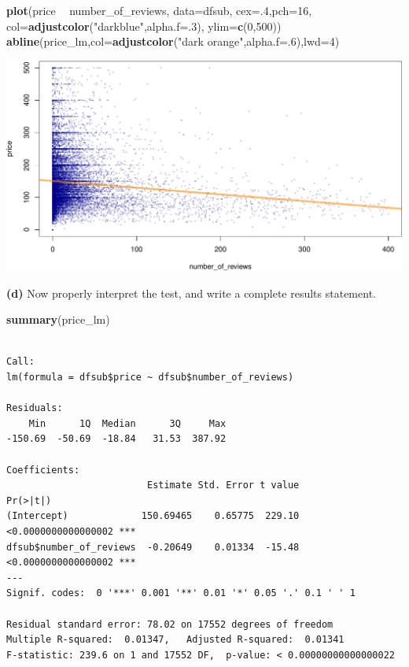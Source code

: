 \documentclass[]{book}
\newenvironment{Shaded}{\begin{snugshade}}{\end{snugshade}}
\newcommand{\DataTypeTok}[1]{\textcolor[rgb]{0.13,0.29,0.53}{#1}}
\newcommand{\DecValTok}[1]{\textcolor[rgb]{0.00,0.00,0.81}{#1}}
\newcommand{\KeywordTok}[1]{\textcolor[rgb]{0.13,0.29,0.53}{\textbf{#1}}}
\newcommand{\NormalTok}[1]{#1}
\newcommand{\OperatorTok}[1]{\textcolor[rgb]{0.81,0.36,0.00}{\textbf{#1}}}
\newcommand{\StringTok}[1]{\textcolor[rgb]{0.31,0.60,0.02}{#1}}
\begin{document}
\begin{Shaded}
\begin{Highlighting}[]
\KeywordTok{plot}\NormalTok{(price }\OperatorTok{~}\StringTok{ }\NormalTok{number_of_reviews,}
     \DataTypeTok{data=}\NormalTok{dfsub,}
     \DataTypeTok{cex=}\NormalTok{.}\DecValTok{4}\NormalTok{,}\DataTypeTok{pch=}\DecValTok{16}\NormalTok{,}
     \DataTypeTok{col=}\KeywordTok{adjustcolor}\NormalTok{(}\StringTok{"darkblue"}\NormalTok{,}\DataTypeTok{alpha.f=}\NormalTok{.}\DecValTok{3}\NormalTok{),}
     \DataTypeTok{ylim=}\KeywordTok{c}\NormalTok{(}\DecValTok{0}\NormalTok{,}\DecValTok{500}\NormalTok{))}
\KeywordTok{abline}\NormalTok{(price_lm,}\DataTypeTok{col=}\KeywordTok{adjustcolor}\NormalTok{(}\StringTok{"dark orange"}\NormalTok{,}\DataTypeTok{alpha.f=}\NormalTok{.}\DecValTok{6}\NormalTok{),}\DataTypeTok{lwd=}\DecValTok{4}\NormalTok{)}
\end{Highlighting}
\end{Shaded}

\includegraphics{figures/unnamed-chunk-344-1.pdf}

\textbf{(d)} Now properly interpret the test, and write a complete results statement.

\begin{Shaded}
\begin{Highlighting}[]
\KeywordTok{summary}\NormalTok{(price_lm)}
\end{Highlighting}
\end{Shaded}

\begin{verbatim}

Call:
lm(formula = dfsub$price ~ dfsub$number_of_reviews)

Residuals:
    Min      1Q  Median      3Q     Max 
-150.69  -50.69  -18.84   31.53  387.92 

Coefficients:
                         Estimate Std. Error t value            Pr(>|t|)    
(Intercept)             150.69465    0.65775  229.10 <0.0000000000000002 ***
dfsub$number_of_reviews  -0.20649    0.01334  -15.48 <0.0000000000000002 ***
---
Signif. codes:  0 '***' 0.001 '**' 0.01 '*' 0.05 '.' 0.1 ' ' 1

Residual standard error: 78.02 on 17552 degrees of freedom
Multiple R-squared:  0.01347,   Adjusted R-squared:  0.01341 
F-statistic: 239.6 on 1 and 17552 DF,  p-value: < 0.00000000000000022
\end{verbatim}
\end{document}
